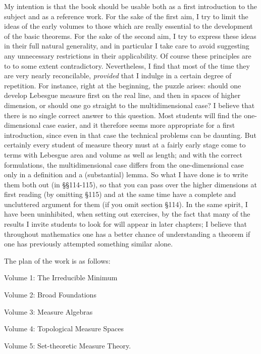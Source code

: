 My intention is that the book should be usable both as a first
introduction to the subject and as a reference work.   For the sake of
the first aim, I try to limit the ideas of the early volumes to those
which are really essential to the development of the basic theorems.
For the sake of the second aim, I try to express these ideas in their
full natural generality, and in particular I take care to avoid
suggesting any unnecessary restrictions in their applicability.   Of
course these principles are to to some extent contradictory.
Nevertheless, I find that most of the time they are very nearly
reconcilable, {\it provided} that I indulge in a certain degree of
repetition.   For instance, right at the beginning, the puzzle arises:
should one develop Lebesgue measure first on the real line, and then in
spaces of higher dimension, or should one go straight to the
multidimensional case?   I believe that there is no single correct
answer to this question.   Most students will find the one-dimensional
case easier, and it therefore seems more appropriate for a first
introduction, since even in that case the technical problems can be
daunting.   But certainly every student of measure theory must at a
fairly early stage
come to terms with Lebesgue area and volume as well as length;
and with the correct formulations, the multidimensional case differs
from the one-dimensional case only in a definition and a (substantial)
lemma.   So what I have done is to write them both out (in
\S\S114-115), so that you can pass over the higher dimensions at first
reading (by omitting \S115) and at the same time have a complete
and uncluttered argument for them (if you omit section \S114).
In the same spirit, I have been uninhibited, when setting out exercises,
by the fact that many of the results I invite students to look for will
appear in later chapters;  I believe that throughout mathematics one has
a better chance of understanding a theorem if one has previously
attempted something similar alone.

The plan of the work is as follows:

\medskip

\qquad\qquad Volume 1:  The Irreducible Minimum

\qquad\qquad Volume 2:  Broad Foundations

\qquad\qquad Volume 3:  Measure Algebras

\qquad\qquad Volume 4:  Topological Measure Spaces

\qquad\qquad Volume 5:  Set-theoretic Measure Theory.

